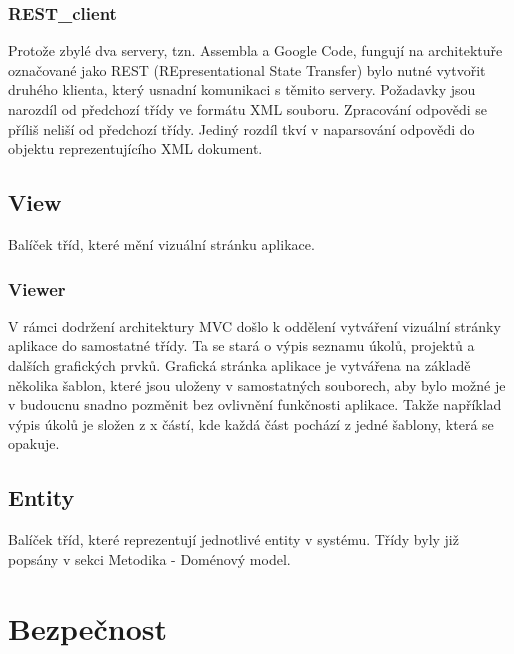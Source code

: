 \subsubsection{REST\_client}

Protože zbylé dva servery, tzn. Assembla a Google Code, fungují na architektuře označované jako REST (REpresentational State Transfer) bylo nutné vytvořit druhého klienta, který usnadní komunikaci s těmito servery. Požadavky jsou narozdíl od předchozí třídy ve formátu XML souboru. Zpracování odpovědi se příliš neliší od předchozí třídy. Jediný rozdíl tkví v naparsování odpovědi do objektu reprezentujícího XML dokument.

\subsection{View}

Balíček tříd, které mění vizuální stránku aplikace.

\subsubsection{Viewer}

V rámci dodržení architektury MVC došlo k oddělení vytváření vizuální stránky aplikace do samostatné třídy. Ta se stará o výpis seznamu úkolů, projektů a dalších grafických prvků. Grafická stránka aplikace je vytvářena na základě několika šablon, které jsou uloženy v samostatných souborech, aby bylo možné je v budoucnu snadno pozměnit bez ovlivnění funkčnosti aplikace. Takže například výpis úkolů je složen z x částí, kde každá část pochází z jedné šablony, která se opakuje.

\subsection{Entity}

Balíček tříd, které reprezentují jednotlivé entity v systému. Třídy byly již popsány v sekci Metodika - Doménový model.

\section{Bezpečnost}

